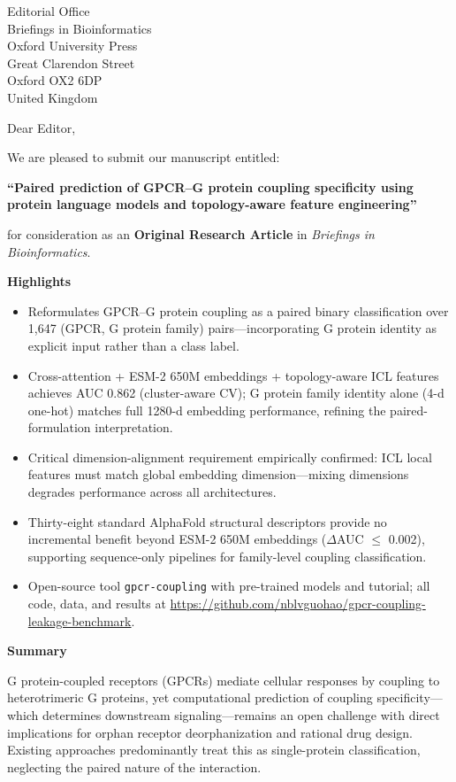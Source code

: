\documentclass[11pt]{letter}
\begin{document}
\begin{letter}{Editorial Office\\
Briefings in Bioinformatics\\
Oxford University Press\\
Great Clarendon Street\\
Oxford OX2 6DP\\
United Kingdom}

\opening{Dear Editor,}

We are pleased to submit our manuscript entitled:

\textbf{``Paired prediction of GPCR--G protein coupling specificity using protein language models and topology-aware feature engineering''}

for consideration as an \textbf{Original Research Article} in \textit{Briefings in Bioinformatics}.

\textbf{Highlights}
\begin{itemize}
  \item Reformulates GPCR--G protein coupling as a paired binary classification over 1,647 (GPCR, G protein family) pairs---incorporating G protein identity as explicit input rather than a class label.
  \item Cross-attention + ESM-2 650M embeddings + topology-aware ICL features achieves AUC 0.862 (cluster-aware CV); G protein family identity alone (4-d one-hot) matches full 1280-d embedding performance, refining the paired-formulation interpretation.
  \item Critical dimension-alignment requirement empirically confirmed: ICL local features must match global embedding dimension---mixing dimensions degrades performance across all architectures.
  \item Thirty-eight standard AlphaFold structural descriptors provide no incremental benefit beyond ESM-2 650M embeddings ($\Delta$AUC $\le$ 0.002), supporting sequence-only pipelines for family-level coupling classification.
  \item Open-source tool \texttt{gpcr-coupling} with pre-trained models and tutorial; all code, data, and results at \url{https://github.com/nblvguohao/gpcr-coupling-leakage-benchmark}.
\end{itemize}

\textbf{Summary}

G protein-coupled receptors (GPCRs) mediate cellular responses by coupling to heterotrimeric G proteins, yet computational prediction of coupling specificity---which determines downstream signaling---remains an open challenge with direct implications for orphan receptor deorphanization and rational drug design. Existing approaches predominantly treat this as single-protein classification, neglecting the paired nature of the interaction.


\end{letter}
\end{document}
